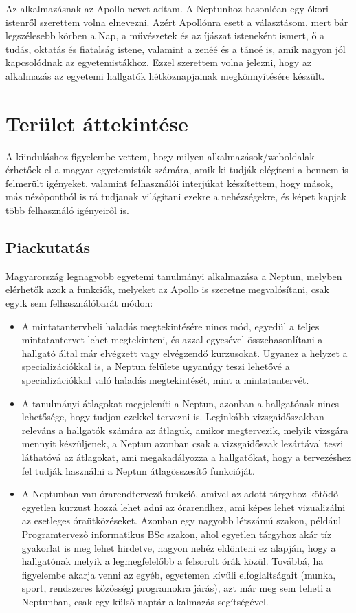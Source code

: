 \documentclass[a4paper,12pt]{report}
\begin{document}
Az alkalmazásnak az Apollo nevet adtam. A Neptunhoz hasonlóan egy ókori istenről szerettem volna elnevezni. Azért Apollónra esett a választásom, mert bár legszélesebb körben a Nap, a művészetek és az íjászat isteneként ismert, ő a tudás, oktatás és fiatalság istene, valamint a zenéé és a táncé is, amik nagyon jól kapcsolódnak az egyetemistákhoz. Ezzel szerettem volna jelezni, hogy az alkalmazás az egyetemi hallgatók hétköznapjainak megkönnyítésére készült.

\section{Terület áttekintése}

A kiinduláshoz figyelembe vettem, hogy milyen alkalmazások/weboldalak érhetőek el a magyar egyetemisták számára, amik ki tudják elégíteni a bennem is felmerült igényeket, valamint felhasználói interjúkat készítettem, hogy mások, más nézőpontból is rá tudjanak világítani ezekre a nehézségekre, és képet kapjak több felhasználó igényeiről is.

\subsection{Piackutatás}

Magyarország legnagyobb egyetemi tanulmányi alkalmazása a Neptun, melyben elérhetők azok a funkciók, melyeket az Apollo is szeretne megvalósítani, csak egyik sem felhasználóbarát módon:

\begin{itemize}
    \item A mintatantervbeli haladás megtekintésére nincs mód, egyedül a teljes mintatantervet lehet megtekinteni, és azzal egyesével összehasonlítani a hallgató által már elvégzett vagy elvégzendő kurzusokat. Ugyanez a helyzet a specializációkkal is, a Neptun felülete ugyanúgy teszi lehetővé a specializációkkal való haladás megtekintését, mint a mintatantervét.
    \item A tanulmányi átlagokat megjeleníti a Neptun, azonban a hallgatónak nincs lehetősége, hogy tudjon ezekkel tervezni is. Leginkább vizsgaidőszakban releváns a hallgatók számára az átlaguk, amikor megtervezik, melyik vizsgára mennyit készüljenek, a Neptun azonban csak a vizsgaidőszak lezártával teszi láthatóvá az átlagokat, ami megakadályozza a hallgatókat, hogy a tervezéshez fel tudják használni a Neptun átlagösszesítő funkcióját.
    \item A Neptunban van órarendtervező funkció, amivel az adott tárgyhoz kötődő egyetlen kurzust hozzá lehet adni az órarendhez, ami képes lehet vizualizálni az esetleges óraütközéseket. Azonban egy nagyobb létszámú szakon, például Programtervező informatikus BSc szakon, ahol egyetlen tárgyhoz akár tíz gyakorlat is meg lehet hirdetve, nagyon nehéz eldönteni ez alapján, hogy a hallgatónak melyik a legmegfelelőbb a felsorolt órák közül. Továbbá, ha figyelembe akarja venni az egyéb, egyetemen kívüli elfoglaltságait (munka, sport, rendszeres közösségi programokra járás), azt már meg sem teheti a Neptunban, csak egy külső naptár alkalmazás segítségével.
\end{itemize}
\end{document}

